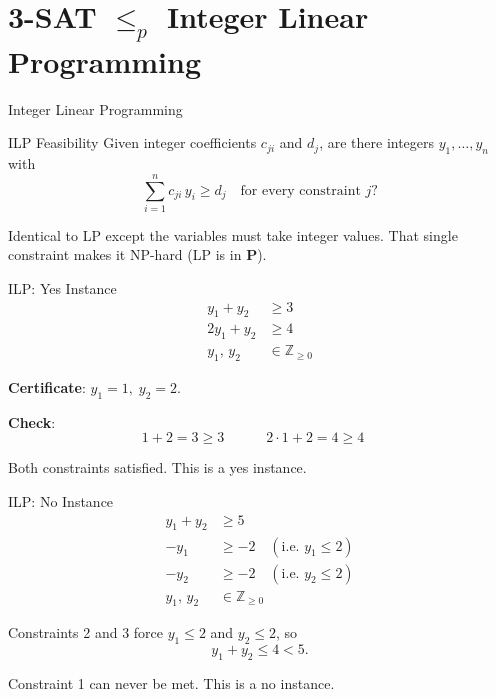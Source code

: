 \documentclass[10pt,aspectratio=169]{beamer}
\begin{document}
\section{3-SAT $\le_p$ Integer Linear Programming}

\begin{frame}{Integer Linear Programming}
  \begin{block}{ILP Feasibility}
    Given integer coefficients $c_{ji}$ and $d_j$, are there
    \alert{integers} $y_1, \ldots, y_n$ with
    \[
      \sum_{i=1}^{n} c_{ji}\, y_i \ge d_j \quad \text{for every constraint } j?
    \]
  \end{block}

  \bigskip
  Identical to LP except the variables must take \alert{integer} values.
  That single constraint makes it NP-hard (LP is in $\mathbf{P}$).
\end{frame}

\begin{frame}{ILP: Yes Instance}
  \[
    \begin{aligned}
      y_1 + y_2  &\ge 3 \\
      2y_1 + y_2 &\ge 4 \\
      y_1,\, y_2 &\in \mathbb{Z}_{\ge 0}
    \end{aligned}
  \]

  \bigskip
  \textbf{Certificate}: $y_1 = 1,\; y_2 = 2$.

  \medskip
  \textbf{Check}:
  \[
    1 + 2 = 3 \ge 3 \quad  \qquad
    2 \cdot 1 + 2 = 4 \ge 4 \quad 
  \]

  \bigskip
  \begin{center}
    Both constraints satisfied. This is a \alert{yes} instance.
  \end{center}
\end{frame}

\begin{frame}{ILP: No Instance}
  \[
    \begin{aligned}
      y_1 + y_2 &\ge 5 \\
     -y_1       &\ge -2 \quad (\text{i.e.\ } y_1 \le 2) \\
     -y_2       &\ge -2 \quad (\text{i.e.\ } y_2 \le 2) \\
      y_1,\, y_2 &\in \mathbb{Z}_{\ge 0}
    \end{aligned}
  \]

  \bigskip
  Constraints 2 and 3 force $y_1 \le 2$ and $y_2 \le 2$, so
  \[
    y_1 + y_2 \le 4 < 5.
  \]

  \begin{center}
    Constraint 1 can never be met. This is a \alert{no} instance.
  \end{center}
\end{frame}
\end{document}
